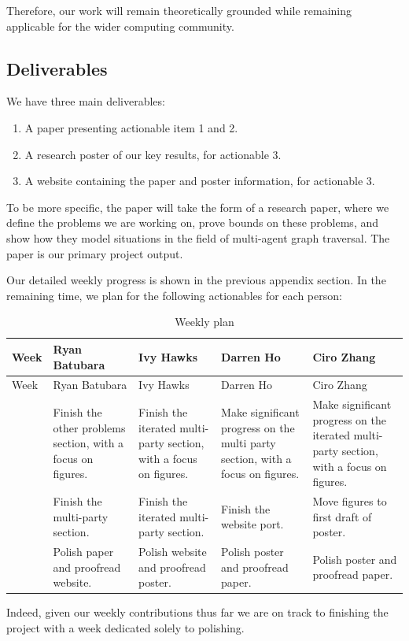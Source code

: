 Therefore, our work will remain theoretically grounded while remaining applicable for the wider computing community.

\subsection{Deliverables}

We have three main deliverables:

\begin{enumerate}
    \item A paper presenting actionable item 1 and 2.
    \item A research poster of our key results, for actionable 3.
    \item A website containing the paper and poster information, for actionable 3.
\end{enumerate}

To be more specific, the paper will take the form of a research paper, where we define the problems we are working on, prove bounds on these problems, and show how they model situations in the field of multi-agent graph traversal. The paper is our primary project output.

Our detailed weekly progress is shown in the previous appendix section. In the remaining time, we plan for the following actionables for each person:

\small
\setlength{\tabcolsep}{4pt}
\begin{longtable}{@{}>{\raggedright\arraybackslash}p{}>{\raggedright\arraybackslash}p{}>{\raggedright\arraybackslash}p{}>{\raggedright\arraybackslash}p{}>{\raggedright\arraybackslash}p{}@{}}
\caption{Weekly plan }
\label{tab:weekly-contributions}\\
\toprule
Week & Ryan Batubara & Ivy Hawks & Darren Ho & Ciro Zhang \\
\midrule
\endfirsthead
\toprule
Week & Ryan Batubara & Ivy Hawks & Darren Ho & Ciro Zhang \\
\midrule
\endhead
\bottomrule
\endfoot
\bottomrule
\endlastfoot
7 
& Finish the other problems section, with a focus on figures.
& Finish the iterated multi-party section, with a focus on figures.
& Make significant progress on the multi party section, with a focus on figures.
& Make significant progress on the iterated multi-party section, with a focus on figures.
\\
8 
& Finish the multi-party section.
& Finish the iterated multi-party section.
& Finish the website port.
& Move figures to first draft of poster.
\\
9
& Polish paper and proofread website.
& Polish website and proofread poster.
& Polish poster and proofread paper.
& Polish poster and proofread paper.
\end{longtable}
\normalsize

Indeed, given our weekly contributions thus far we are on track to finishing the project with a week dedicated solely to polishing.
